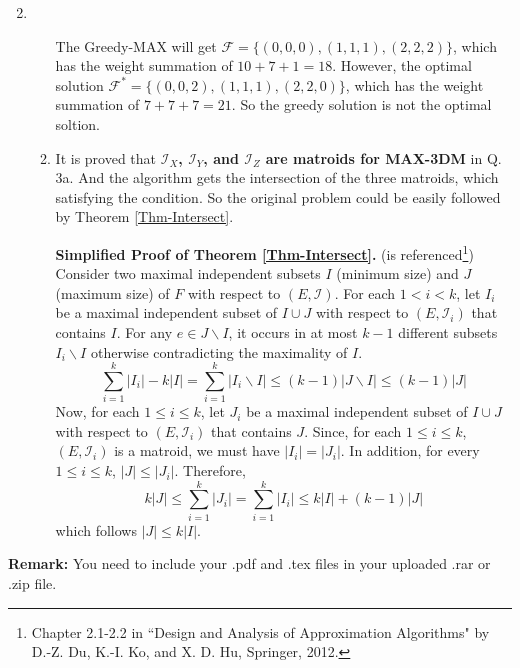 \documentclass[12pt,a4paper]{article}
\makeatletter
\newtheorem*{solution}{Solution}
\theoremstyle{definition}
\renewenvironment{solution}[1][Solution] {\par\pushQED{\qed}\normalfont\topsep6\p@\@plus6\p@\relax\trivlist\item[\hskip\labelsep\bfseries#1\@addpunct{.}]\ignorespaces}{\popQED\endtrivlist\@endpefalse} \makeatother
\makeatother
\begin{document}
\begin{enumerate}
\begin{solution}
\begin{enumerate}
			The Greedy-MAX will get $\mathcal{F}=\{(0,0,0),(1,1,1),(2,2,2)\}$, which has the weight summation of $10+7+1=18$. However, the optimal solution $\mathcal{F}^*=\{(0,0,2),(1,1,1),(2,2,0)\}$, which has the weight summation of $7+7+7=21$. So the greedy solution is not the optimal soltion.
			\item It is proved that \textbf{$\mathcal{I}_X$, $\mathcal{I}_Y$, and $\mathcal{I}_Z$ are matroids for MAX-3DM} in Q. 3a. And the algorithm gets the intersection of the three matroids, which satisfying the condition. So the original problem could be easily followed by Theorem \ref{Thm-Intersect}.
			
			\textbf{Simplified Proof of Theorem \ref{Thm-Intersect}.} (is referenced\footnote{Chapter 2.1-2.2 in ``Design and Analysis of Approximation Algorithms" by D.-Z. Du, K.-I. Ko, and X. D. Hu, Springer, 2012.}) Consider two maximal independent subsets $I$ (minimum size) and $J$ (maximum size) of $F$ with respect to $(E,\mathcal{I})$. For each $1<i<k$, let $I_i$ be a maximal independent subset of $I\cup J$ with respect to $(E,\mathcal{I}_i)$ that contains $I$. For any $e\in J\backslash I$, it occurs in at most $k-1$ different subsets $I_i\backslash I$ otherwise contradicting the maximality of $I$.
			\begin{equation*}
				\sum_{i=1}^k |I_i|-k|I|=\sum_{i=1}^k |I_i\backslash I|\leq (k-1)|J\backslash I|\leq (k-1)|J|
			\end{equation*}
			Now, for each $1\leq i\leq k$, let $J_i$ be a maximal independent subset of $I\cup J$ with respect to $(E,\mathcal{I}_i)$ that contains $J$. Since, for each $1\leq i\leq k$, $(E,\mathcal{I}_i)$ is a matroid, we must have $|I_i|=|J_i|$. In addition, for every $1\leq i\leq k$, $|J|\leq |J_i|$. Therefore,
			\begin{equation*}
				k|J|\leq \sum_{i=1}^k|J_i|=\sum_{i=1}^k|I_i|\leq k|I|+(k-1)|J|
			\end{equation*}
			which follows $|J|\leq k|I|$.
		\end{enumerate}
	\end{solution}
\end{enumerate}

\vspace{20pt}

\textbf{Remark:} You need to include your .pdf and .tex files in your uploaded .rar or .zip file.

\end{document}
